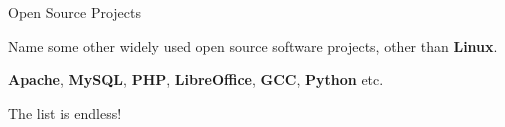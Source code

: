 \begin{Lab}
\begin{exe} {Open Source Projects}

   Name some other widely used open source software
   projects, other than \textbf{Linux}.

   \begin{sol}

      \textbf{Apache}, \textbf{MySQL}, \textbf{PHP},
      \textbf{LibreOffice}, \textbf{GCC}, \textbf{Python}
      etc.

      The list is endless!

   \end{sol}
\end{exe}

\end{Lab}

